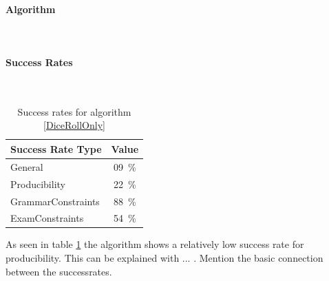 \paragraph{Algorithm} \mbox{} \\

\noindent
{}

\paragraph{Success Rates} \mbox{}\\
\begin{table}[h]
\begin{center}
	\begin{tabular}{ | l | c |}
		\hline
		Success Rate Type 			& Value   						\\ \hline
																   \hline
		General 					& 09~\%     					\\ \hline
		Producibility 				& 22~\% 	 					\\ \hline
		GrammarConstraints 			& 88~\% 						\\ \hline
		ExamConstraints 			& 54~\% 						\\ \hline
	\end{tabular}
	\caption{Success rates for algorithm \ref{DiceRollOnly}}
	\label{DiceRollOnlySR}
\end{center}
\end{table}
\noindent As seen in table \ref{DiceRollOnlySR} the algorithm shows a relatively low success rate for producibility. This can be explained with ... . Mention the basic connection between the successrates.

